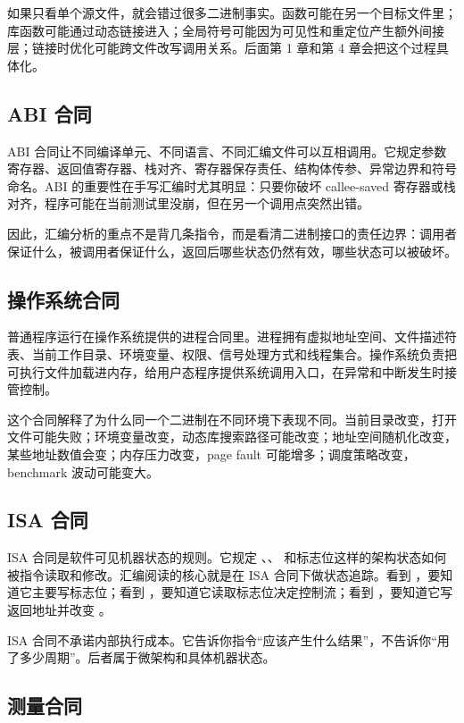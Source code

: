 如果只看单个源文件，就会错过很多二进制事实。函数可能在另一个目标文件里；库函数可能通过动态链接进入；全局符号可能因为可见性和重定位产生额外间接层；链接时优化可能跨文件改写调用关系。后面第 1 章和第 4 章会把这个过程具体化。

\subsection{ABI 合同}

ABI 合同让不同编译单元、不同语言、不同汇编文件可以互相调用。它规定参数寄存器、返回值寄存器、栈对齐、寄存器保存责任、结构体传参、异常边界和符号命名。ABI 的重要性在手写汇编时尤其明显：只要你破坏 callee-saved 寄存器或栈对齐，程序可能在当前测试里没崩，但在另一个调用点突然出错。

因此，汇编分析的重点不是背几条指令，而是看清二进制接口的责任边界：调用者保证什么，被调用者保证什么，返回后哪些状态仍然有效，哪些状态可以被破坏。

\subsection{操作系统合同}

普通程序运行在操作系统提供的进程合同里。进程拥有虚拟地址空间、文件描述符表、当前工作目录、环境变量、权限、信号处理方式和线程集合。操作系统负责把可执行文件加载进内存，给用户态程序提供系统调用入口，在异常和中断发生时接管控制。

这个合同解释了为什么同一个二进制在不同环境下表现不同。当前目录改变，打开文件可能失败；环境变量改变，动态库搜索路径可能改变；地址空间随机化改变，某些地址数值会变；内存压力改变，page fault 可能增多；调度策略改变，benchmark 波动可能变大。

\subsection{ISA 合同}

ISA 合同是软件可见机器状态的规则。它规定 、、 和标志位这样的架构状态如何被指令读取和修改。汇编阅读的核心就是在 ISA 合同下做状态追踪。看到 ，要知道它主要写标志位；看到 ，要知道它读取标志位决定控制流；看到 ，要知道它写返回地址并改变 。

ISA 合同不承诺内部执行成本。它告诉你指令“应该产生什么结果”，不告诉你“用了多少周期”。后者属于微架构和具体机器状态。

\subsection{测量合同}

